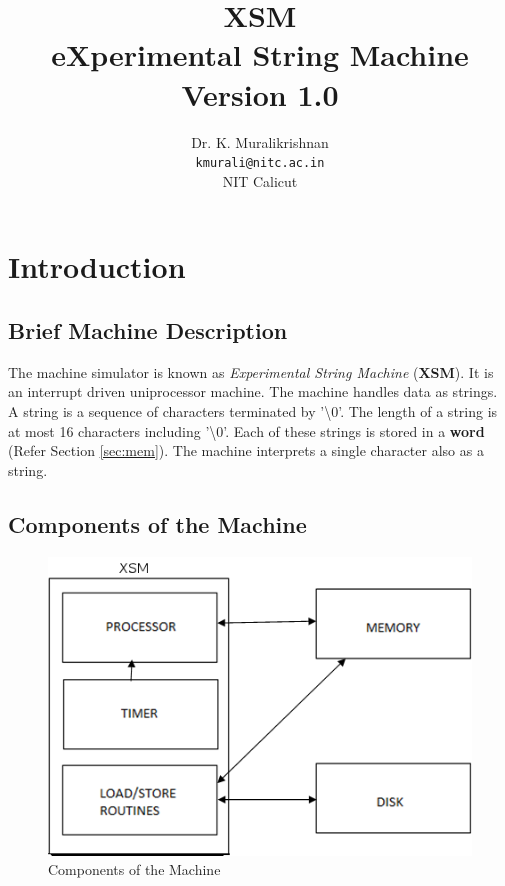 \documentclass[11pt]{report}
\title{XSM \\ eXperimental String Machine \\
Version 1.0}
\author{Dr. K. Muralikrishnan  \\ \texttt{kmurali@nitc.ac.in} \\ {NIT Calicut} }
\begin{document}
\maketitle
\pagebreak

\thispagestyle{plain}

\tableofcontents
\pagebreak


\chapter{Introduction}

\section{Brief Machine Description}
The machine simulator is known as \textit{Experimental String Machine} (\textbf{XSM}). It is an interrupt driven uniprocessor machine. The machine handles data as strings. A string is a sequence of characters terminated by ’\textbackslash 0’. The length of a string is at most 16 characters including ’\textbackslash 0’. Each of these strings is stored in a \textbf{word} (Refer Section \ref{sec:mem}). The machine interprets a single character also as a string.

\section{Components of the Machine}

\begin{figure}[hbtp]
\begin{center}
\includegraphics[scale=0.5]{block.png}
\end{center}
\caption{Components of the Machine}
\end{figure}
\end{document}
